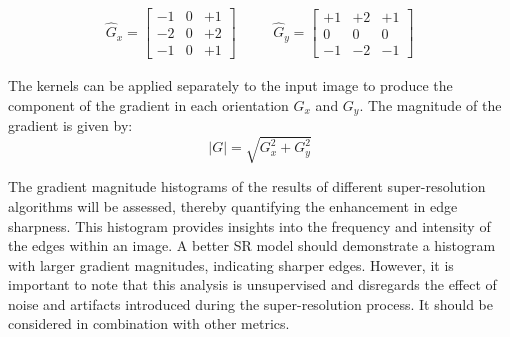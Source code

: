         \begin{equation}
            \begin{array}{ccc}
            \hat{G}_x = \begin{bmatrix}
            -1 & 0 & +1 \\
            -2 & 0 & +2 \\
            -1 & 0 & +1
            \end{bmatrix}
            &
            \quad
            &
            \hat{G}_y = \begin{bmatrix}
            +1 & +2 & +1 \\
             0 &  0 &  0 \\
            -1 & -2 & -1
            \end{bmatrix}
            \end{array}
            \label{eq:4-sobel-operators}
        \end{equation}
    
         The kernels can be applied separately to the input image to produce the component of the gradient in each orientation $G_x$ and $G_y$. The magnitude of the gradient  is given by: 
         \begin{equation}
             |G| = \sqrt{G_x^2 + G_y^2}
             \label{eq:4-gradient_magnitude}
         \end{equation}

         The gradient magnitude histograms of the results of different super-resolution algorithms will be assessed, thereby quantifying the enhancement in edge sharpness.
         This histogram provides insights into the frequency and intensity of the edges within an image.
         A better SR model should demonstrate a histogram with larger gradient magnitudes, indicating sharper edges.
         However, it is important to note that this analysis is unsupervised and disregards the effect of noise and artifacts introduced during the super-resolution process. It should be considered in combination with other metrics.

